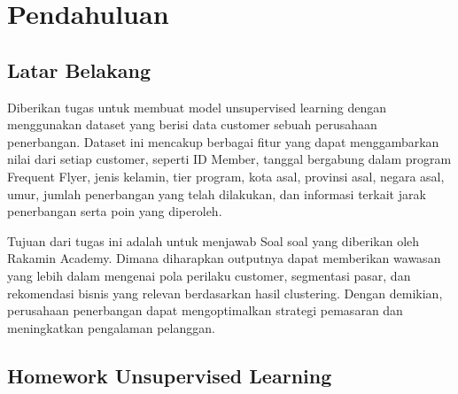 \section{Pendahuluan}
\subsection{Latar Belakang}

Diberikan tugas untuk membuat model unsupervised learning dengan menggunakan dataset yang berisi data customer sebuah perusahaan penerbangan. Dataset ini mencakup berbagai fitur yang dapat menggambarkan nilai dari setiap customer, seperti ID Member, tanggal bergabung dalam program Frequent Flyer, jenis kelamin, tier program, kota asal, provinsi asal, negara asal, umur, jumlah penerbangan yang telah dilakukan, dan informasi terkait jarak penerbangan serta poin yang diperoleh.

Tujuan dari tugas ini adalah untuk menjawab Soal soal yang diberikan oleh Rakamin Academy. Dimana diharapkan outputnya dapat memberikan wawasan yang lebih dalam mengenai pola perilaku customer, segmentasi pasar, dan rekomendasi bisnis yang relevan berdasarkan hasil clustering. Dengan demikian, perusahaan penerbangan dapat mengoptimalkan strategi pemasaran dan meningkatkan pengalaman pelanggan.

\subsection{Homework Unsupervised Learning}


